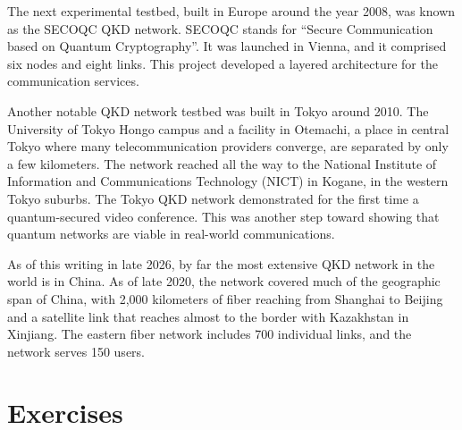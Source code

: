 The next experimental testbed, built in Europe around the year 2008, was known as the SECOQC QKD network.
SECOQC stands for ``Secure Communication based on Quantum Cryptography''.
It was launched in Vienna, and it comprised six nodes and eight links. This project developed a layered architecture for the communication services.

Another notable QKD network testbed was built in Tokyo around 2010.
The University of Tokyo Hongo campus and a facility in Otemachi, a place in central Tokyo where many telecommunication providers converge, are separated by only a few kilometers.
The network reached all the way to the National Institute of Information and Communications Technology (NICT) in Kogane, in the western Tokyo suburbs.
The Tokyo QKD network demonstrated for the first time a quantum-secured video conference.
This was another step toward showing that quantum networks are viable in real-world communications.

As of this writing in late 2026, by far the most extensive QKD network in the world is in China.
As of late 2020, the network covered much of the geographic span of China, with 2,000 kilometers of fiber reaching from Shanghai to Beijing and a satellite link that reaches almost to the border with Kazakhstan in Xinjiang.
The eastern fiber network includes 700 individual links, and the network serves 150 users.



\newpage
\section{Exercises}

